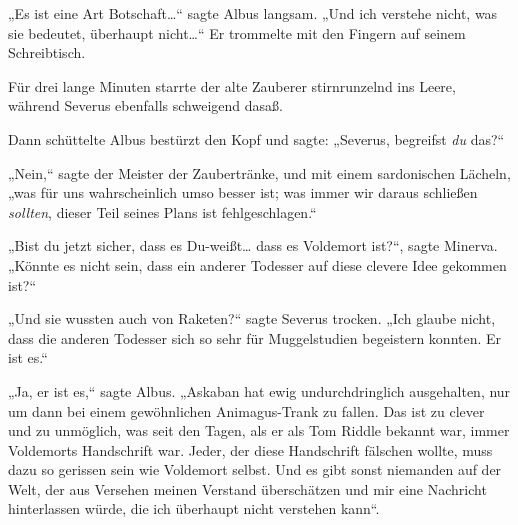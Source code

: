 „Es ist eine Art Botschaft…“ sagte Albus langsam. „Und ich verstehe nicht, was sie bedeutet, überhaupt nicht…“ Er trommelte mit den Fingern auf seinem Schreibtisch.

Für drei lange Minuten starrte der alte Zauberer stirnrunzelnd ins Leere, während Severus ebenfalls schweigend dasaß.

Dann schüttelte Albus bestürzt den Kopf und sagte: „Severus, begreifst \emph{du} das?“

„Nein,“ sagte der Meister der Zaubertränke, und mit einem sardonischen Lächeln, „was für uns wahrscheinlich umso besser ist; was immer wir daraus schließen \emph{sollten}, dieser Teil seines Plans ist fehlgeschlagen.“

„Bist du jetzt sicher, dass es Du-weißt… dass es Voldemort ist?“, sagte Minerva. „Könnte es nicht sein, dass ein anderer Todesser auf diese clevere Idee gekommen ist?“

„Und sie wussten auch von Raketen?“ sagte Severus trocken. „Ich glaube nicht, dass die anderen Todesser sich so sehr für Muggelstudien begeistern konnten. Er ist es.“

„Ja, er ist es,“ sagte Albus. „Askaban hat ewig undurchdringlich ausgehalten, nur um dann bei einem gewöhnlichen Animagus-Trank zu fallen. Das ist zu clever und zu unmöglich, was seit den Tagen, als er als Tom Riddle bekannt war, immer Voldemorts Handschrift war. Jeder, der diese Handschrift fälschen wollte, muss dazu so gerissen sein wie Voldemort selbst. Und es gibt sonst niemanden auf der Welt, der aus Versehen meinen Verstand überschätzen und mir eine Nachricht hinterlassen würde, die ich überhaupt nicht verstehen kann“.

